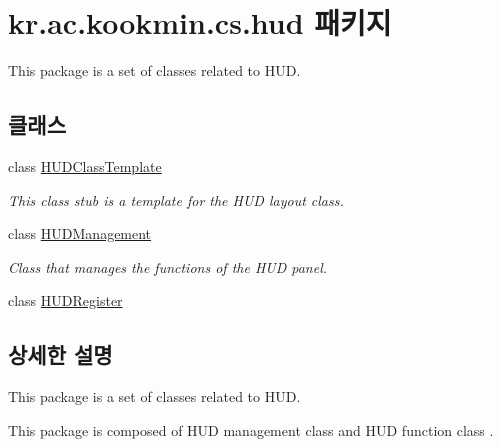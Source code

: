 \hypertarget{namespacekr_1_1ac_1_1kookmin_1_1cs_1_1hud}{}\section{kr.\+ac.\+kookmin.\+cs.\+hud 패키지}
\label{namespacekr_1_1ac_1_1kookmin_1_1cs_1_1hud}


This package is a set of classes related to H\+U\+D.  


\subsection*{클래스}
\begin{DoxyCompactItemize}
\item 
class \hyperlink{classkr_1_1ac_1_1kookmin_1_1cs_1_1hud_1_1_h_u_d_class_template}{H\+U\+D\+Class\+Template}
\begin{DoxyCompactList}\small\item\em This class stub is a template for the H\+U\+D layout class. \end{DoxyCompactList}\item 
class \hyperlink{classkr_1_1ac_1_1kookmin_1_1cs_1_1hud_1_1_h_u_d_management}{H\+U\+D\+Management}
\begin{DoxyCompactList}\small\item\em Class that manages the functions of the H\+U\+D panel. \end{DoxyCompactList}\item 
class \hyperlink{classkr_1_1ac_1_1kookmin_1_1cs_1_1hud_1_1_h_u_d_register}{H\+U\+D\+Register}
\end{DoxyCompactItemize}


\subsection{상세한 설명}
This package is a set of classes related to H\+U\+D. 

This package is composed of H\+U\+D management class and H\+U\+D function class . 